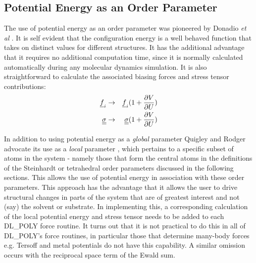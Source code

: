 \subsection{Potential Energy as an Order Parameter}
The use of potential energy as an order parameter was pioneered by Donadio
{\em et al} \cite{donadio-05a}. It is self evident that the configuration
energy is a well behaved function that takes on distinct values for different
structures. It has the additional advantage that it requires no additional
computation time, since it is normally calculated automatically during any
molecular dynamics simulation. It is also straightforward to calculate the
associated biasing forces and stress tensor contributions:
\begin{eqnarray}
\mbox{$\underline{f}$}_{i} &\rightarrow& \mbox{$\underline{f}$}_{i} (1+\frac{\partial V}{\partial U}) \\
\mbox{$\underline{\mbox{$\underline{\sigma}$}}$} &\rightarrow& \mbox{$\underline{\mbox{$\underline{\sigma}$}}$} (1+\frac{\partial V}{\partial U})
\end{eqnarray}

In addition to using potential energy as a {\em global} parameter Quigley and
Rodger advocate its use as a {\em local} parameter \cite{quigley-09a}, which
pertains to a specific subset of atoms in the system - namely those that form
the central atoms in the definitions of the Steinhardt or tetrahedral order
parameters discussed in the following sections. This allows the use of
potential energy in association with these order parameters. This approach has
the advantage that it allows the user to drive structural changes in parts of
the system that are of greatest interest and not (say) the solvent or
substrate. In implementing this, a corresponding calculation of the local
potential energy and stress tensor needs to be added to each DL\_POLY force
routine. It turns out that it is not practical to do this in all of DL\_POLY's
force routines, in particular those that determine many-body forces e.g.
Tersoff and metal potentials do not have this capability. A similar omission
occurs with the reciprocal space term of the Ewald sum.

